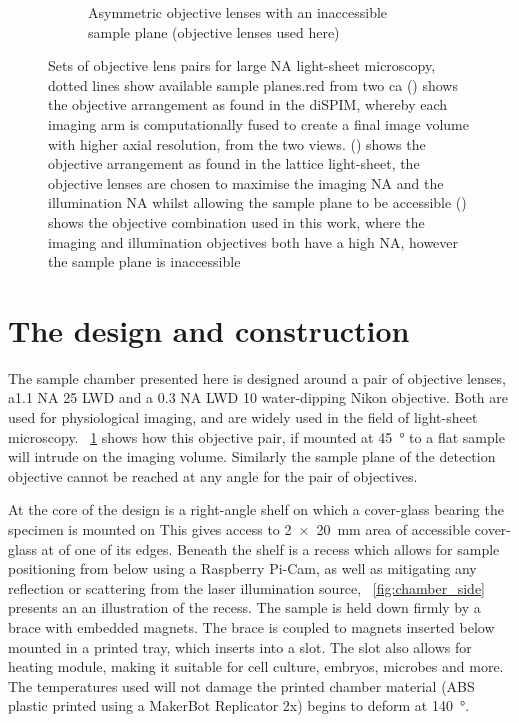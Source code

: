 \begin{figure}
\begin{subfigure}[t]{0.45\linewidth}
        \caption{Asymmetric objective lenses with an inaccessible \gls{sample plane} (objective lenses used here)}\label{fig:assymetric_nikon}
    \end{subfigure}
    \caption[Sets of objective lens pairs for large \gls{NA} \gls{light-sheet} microscopy]{
    Sets of objective lens pairs for large \gls{NA} \gls{light-sheet} microscopy, dotted lines show available sample planes.red from two ca
    () shows the objective arrangement as found in the \gls{diSPIM}, whereby each imaging arm is computationally fused to create a final image volume with higher axial resolution, from the two views.
    () shows the objective arrangement as found in the \gls{lattice light-sheet}, the objective lenses are chosen to maximise the imaging \gls{NA} and the illumination \gls{NA} whilst allowing the sample plane to be accessible
    () shows the objective combination used in this work, where the imaging and illumination objectives both have a high \gls{NA}, however the \gls{sample plane} is inaccessible
    }\label{fig:objective_matching}
\end{figure}

\section{The design and construction}

The sample chamber presented here is designed around a pair of objective lenses, a1.1 \gls{NA} \SI{25}{\times} \gls{LWD} and a 0.3 \gls{NA} LWD \SI{10}{\times} water-dipping Nikon objective.
Both are used for physiological imaging, and are widely used in the field of light-sheet microscopy.
\figurename~\ref{fig:assymetric_nikon} shows how this objective pair, if mounted at \SI{45}{\degree} to a flat sample will intrude on the imaging volume.
Similarly the sample plane of the detection objective cannot be reached at any angle for the pair of objectives.

At the core of the design is a right-angle shelf on which a cover-glass bearing the specimen is mounted on
This gives access to \SI{2x20}{\milli\metre} area of accessible cover-glass at of one of its edges.
Beneath the shelf is a recess which allows for sample positioning from below using a Raspberry Pi-Cam, as well as mitigating any reflection or scattering from the laser illumination source, \figurename~\ref{fig:chamber_side} presents an an illustration of the recess.
The sample is held down firmly by a  brace with embedded magnets.
The brace is coupled to magnets inserted below mounted in a printed tray, which inserts into a slot.
The slot also allows for heating module, making it suitable for cell culture, embryos, microbes and more.
The temperatures used will not damage the printed chamber material (\gls{ABS} plastic printed using a MakerBot Replicator 2x) begins to deform at \SI{140}{\degree}.

